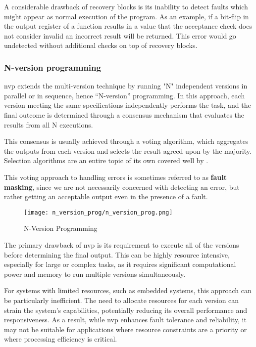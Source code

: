 A considerable drawback of recovery blocks is its inability to detect faults which might appear as normal execution of the program. As an example, if a bit-flip in the output register of a function results in a value that the acceptance check does not consider invalid an incorrect result will be returned. This error would go undetected without additional checks on top of recovery blocks.

\subsubsection{N-version programming}

\Acrfull{nvp} \cite{aa:nvp} extends the multi-version technique by running "N" independent versions in parallel or in sequence, hence “N-version” programming. In this approach, each version meeting the same specifications independently performs the task, and the final outcome is determined through a consensus mechanism that evaluates the results from all N executions.

This consensus is usually achieved through a voting algorithm, which aggregates the outputs from each version and selects the result agreed upon by the majority. Selection algorithms are an entire topic of its own covered well by \cite{Aljarbouh_2021}.

This voting approach to handling errors is sometimes referred to as \textbf{fault masking}, since we are not necessarily concerned with detecting an error, but rather getting an acceptable output even in the presence of a fault.

\begin{figure}[hbt!]
    \centering
    \texttt{[image: n\_version\_prog/n\_version\_prog.png]}
    \caption{N-Version Programming}
\end{figure}

The primary drawback of \acrshort{nvp} is its requirement to execute all of the versions before determining the final output. This can be highly resource intensive, especially for large or complex tasks, as it requires significant computational power and memory to run multiple versions simultaneously.

For systems with limited resources, such as embedded systems, this approach can be particularly inefficient. The need to allocate resources for each version can strain the system's capabilities, potentially reducing its overall performance and responsiveness. As a result, while \acrshort{nvp} enhances fault tolerance and reliability, it may not be suitable for applications where resource constraints are a priority or where processing efficiency is critical.

